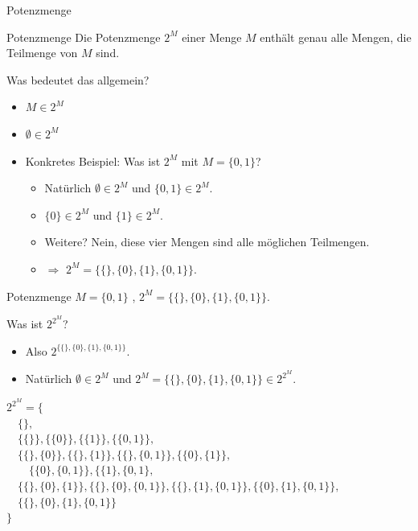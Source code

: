 \documentclass{beamer}
\begin{document}
\begin{frame}{Potenzmenge}
	 
	
	\begin{block}{Potenzmenge}
		Die Potenzmenge   $2^M$   einer Menge $M$   enthält genau alle Mengen, die Teilmenge von $M$ sind.	
	\end{block}
	
	 
	
	Was bedeutet das allgemein?
	
	\begin{itemize}
		\item $M \in 2^M$
		\item $\emptyset \in 2^M$
		\item Konkretes Beispiel:   Was ist $2^M$ mit $M = \{0, 1\}$?
		\begin{itemize}
			\item Natürlich $\emptyset \in 2^M$ und $\{0, 1\} \in 2^M$.
			\item $\{0\} \in 2^M$   und $\{1\} \in 2^M$.
			\item Weitere?   Nein, diese vier Mengen sind alle möglichen Teilmengen.
			\item $\Rightarrow$ $2^M = \{\{\}, \{0\}, \{1\}, \{0, 1\}\}$.
		\end{itemize}
	\end{itemize}
\end{frame}

\begin{frame}{Potenzmenge}
	$M = \{0, 1\}$  , $2^M = \{\{\}, \{0\}, \{1\}, \{0, 1\}\}$. 
	
	Was ist $2^{2^M}$?
	
	\begin{itemize}
		\item Also $2^{\{\{\}, \{0\}, \{1\}, \{0, 1\}\}}$.
		\item Natürlich $\emptyset \in 2^M$ und $2^M = \{\{\}, \{0\}, \{1\}, \{0, 1\}\} \in 2^{2^M}$.
	\end{itemize}
	
	 
	
	$2^{2^M}  
	= 
	\{  $\\$ \quad
	\{\},$\\$ \quad
	\{\{\}\}, 
	\{\{0\}\}, 
	\{\{1\}\},
	\{\{0, 1\}\}, $\\$ \quad
	\{\{\}, \{0\}\}, 
	\{\{\}, \{1\}\}, 
	\{\{\}, \{0, 1\}\}, 
	\{\{0\}, \{1\}\}, $\\$\qquad
	\{\{0\}, \{0, 1\}\}, 
	\{\{1\}, \{0, 1\}, $\\$ \quad
	\{\{\}, \{0\}, \{1\}\}, 
	\{\{\}, \{0\}, \{0, 1\}\}, 
	\{\{\}, \{1\}, \{0, 1\}\}, 
	\{\{0\}, \{1\}, \{0, 1\}\}, $\\$ \quad
	\{\{\}, \{0\}, \{1\}, \{0, 1\}\} $\\$
	\}
	$
\end{frame}
\end{document}
